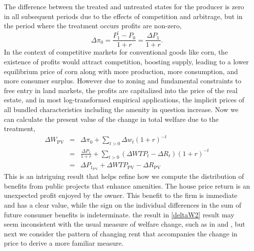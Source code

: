 \documentclass[ecta,nameyear,draft]{econsocart}
\theoremstyle{plain}
\theoremstyle{remark}
\begin{document}
The difference between the treated and untreated states for the producer is zero in all subsequent periods due to the effects of competition and arbitrage, but in the period where the treatment occurs profits are non-zero,
\begin{equation}
	\Delta\pi_0=\frac{P^\prime_1-P_0}{1+r}=\frac{\Delta P_1}{1+r}.\label{pitzero}
\end{equation}
In the context of competitive markets for conventional goods like corn, the existence of profits would attract competition, boosting supply, leading to a lower equilibrium price of corn along with more production, more consumption, and more consumer surplus. However due to zoning and fundamental constraints to free entry in land markets, the profits are capitalized into the price of the real estate, and in most log-transformed empirical applications, the implicit prices of all bundled characteristics including the amenity in question increase.
Now we can calculate the present value of the change in total welfare due to the treatment,
\begin{eqnarray}
	\Delta W_{\mathrm{PV}}&=&\Delta \pi_0+\sum_{t>0}\Delta w_t(1+r)^{-t}\nonumber\\
	&=&\frac{\Delta P_1}{1+r}+\sum_{t>0} (\Delta \mathit{WTP}_t-\Delta R_t)(1+r)^{-t} \label{deltaW1}\\
	&=&\Delta P_{1_{\mathrm{PV}}}+\Delta\mathit{WTP}_\mathrm{PV}-\Delta R_{\mathrm{PV}}\label{deltaW2}
\end{eqnarray}
This is an intriguing result that helps refine how we compute the distribution of benefits from public projects that enhance amenities. The house price return is an unexpected profit enjoyed by the owner. This benefit to the firm is immediate and has a clear value, while the sign on the individual differences in the sum of future consumer benefits is indeterminate. the result in \ref{deltaW2} result may seem inconsistent with the usual measure of welfare change, such as in \cite{freeman14} and \cite{banzhaf20}, but next we consider the pattern of changing rent that accompanies the change in price to derive a more familiar measure. 
\end{document}
